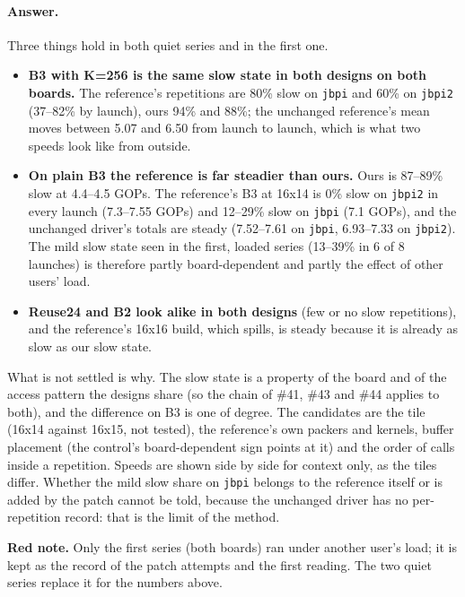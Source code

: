 \documentclass[11pt,a4paper]{article}
\newcommand{\rednote}[1]{\par\smallskip\noindent\textcolor{red!80!black}{\textbf{Red note.} #1}\par\smallskip}
\begin{document}
\paragraph{Answer.} Three things hold in both quiet series and in the first one.
\begin{itemize}
  \item \textbf{B3 with K=256 is the same slow state in both designs on both boards.} The reference's repetitions are 80\% slow on \texttt{jbpi} and 60\% on
  \texttt{jbpi2} (37--82\% by launch), ours 94\% and 88\%; the unchanged reference's mean moves between 5.07 and 6.50 from launch to launch, which is
  what two speeds look like from outside.
  \item \textbf{On plain B3 the reference is far steadier than ours.} Ours is 87--89\% slow at 4.4--4.5 GOPs. The reference's B3 at 16x14 is 0\% slow on
  \texttt{jbpi2} in every launch (7.3--7.55 GOPs) and 12--29\% slow on \texttt{jbpi} (7.1 GOPs), and the unchanged driver's totals are steady
  (7.52--7.61 on \texttt{jbpi}, 6.93--7.33 on \texttt{jbpi2}). The mild slow state seen in the first, loaded series (13--39\% in 6 of 8 launches) is
  therefore partly board-dependent and partly the effect of other users' load.
  \item \textbf{Reuse24 and B2 look alike in both designs} (few or no slow repetitions), and the reference's 16x16 build, which spills, is steady because it is already
  as slow as our slow state.
\end{itemize}
What is not settled is why. The slow state is a property of the board and of the access pattern the designs share (so the chain of \#41, \#43 and \#44 applies to both), and
the difference on B3 is one of degree. The candidates are the tile (16x14 against 16x15, not tested), the reference's own packers and kernels, buffer placement (the
control's board-dependent sign points at it) and the order of calls inside a repetition. Speeds are shown side by side for context only, as the tiles differ.
Whether the mild slow share on \texttt{jbpi} belongs to the reference itself or is added by the patch cannot be told, because the unchanged driver has no per-repetition record:
that is the limit of the method.
\rednote{Only the first series (both boards) ran under another user's load; it is kept as the record of the patch attempts and the first reading. The two quiet series
replace it for the numbers above.}
\end{document}
